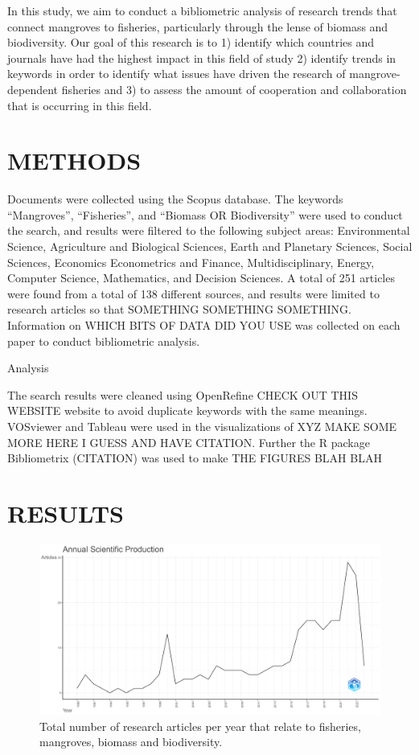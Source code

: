 \documentclass[
  12pt,
]{article}
\begin{document}
In this study, we aim to conduct a bibliometric analysis of research trends that connect mangroves to fisheries, particularly through the lense of biomass and biodiversity. Our goal of this research is to 1) identify which countries and journals have had the highest impact in this field of study 2) identify trends in keywords in order to identify what issues have driven the research of mangrove-dependent fisheries and 3) to assess the amount of cooperation and collaboration that is occurring in this field.

\hypertarget{methods}{%
\section{METHODS}\label{methods}}

Documents were collected using the Scopus database. The keywords ``Mangroves'', ``Fisheries'', and ``Biomass OR Biodiversity'' were used to conduct the search, and results were filtered to the following subject areas: Environmental Science, Agriculture and Biological Sciences, Earth and Planetary Sciences, Social Sciences, Economics Econometrics and Finance, Multidisciplinary, Energy, Computer Science, Mathematics, and Decision Sciences. A total of 251 articles were found from a total of 138 different sources, and results were limited to research articles so that SOMETHING SOMETHING SOMETHING. Information on WHICH BITS OF DATA DID YOU USE was collected on each paper to conduct bibliometric analysis.

Analysis

The search results were cleaned using OpenRefine CHECK OUT THIS WEBSITE website to avoid duplicate keywords with the same meanings. VOSviewer and Tableau were used in the visualizations of XYZ MAKE SOME MORE HERE I GUESS AND HAVE CITATION. Further the R package Bibliometrix (CITATION) was used to make THE FIGURES BLAH BLAH

\hypertarget{results}{%
\section{RESULTS}\label{results}}

\begin{figure}
\includegraphics[width=1\linewidth]{AnnualScientificProduction} \caption{Total number of research articles per year that relate to fisheries, mangroves, biomass and biodiversity. \label{AnnualScientificProduction}}\label{fig:AnnualScientificProduction}
\end{figure}
\end{document}
